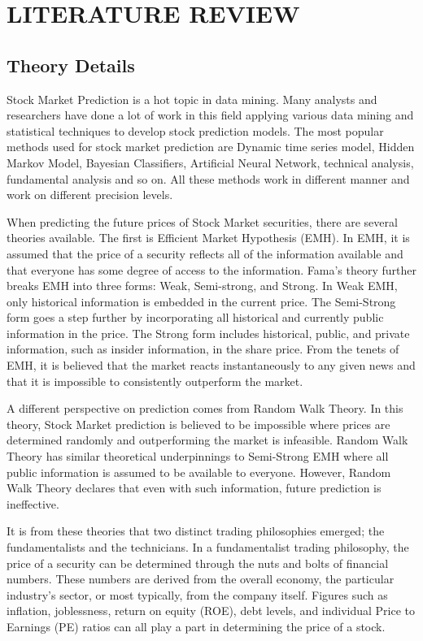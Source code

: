 \section{LITERATURE REVIEW}
\subsection{Theory Details}
Stock Market Prediction is a hot topic in data mining. Many analysts and researchers have done a lot of work in this field applying various data mining and statistical techniques to develop stock prediction models. The most popular methods used for stock market prediction are Dynamic time series model, Hidden Markov Model, Bayesian Classifiers, Artificial Neural Network, technical analysis, fundamental analysis and so on. All these methods work in different manner and work on different precision levels.
 
When predicting the future prices of Stock Market securities, there are several theories available. The first is Efficient Market Hypothesis (EMH). \cite{emh} In EMH, it is assumed that the price of a security reflects all of the information available and that everyone has some degree of access to the information. Fama's theory further breaks EMH into three forms: Weak, Semi-strong, and Strong. In Weak EMH, only historical information is embedded in the current price. The Semi-Strong form goes a step further by incorporating all historical and currently public information in the price. The Strong form includes historical, public, and private information, such as insider information, in the share price. From the tenets of EMH, it is believed that the market reacts instantaneously to any given news and that it is impossible to consistently outperform the market.

A different perspective on prediction comes from Random Walk Theory. \cite{mal} In this theory, Stock Market prediction is believed to be impossible where prices are determined randomly and outperforming the market is infeasible. Random Walk Theory has similar theoretical underpinnings to Semi-Strong EMH where all public information is assumed to be available to everyone. However, Random Walk Theory declares that even with such information, future prediction is ineffective.

It is from these theories that two distinct trading philosophies emerged; the fundamentalists and the technicians. In a fundamentalist trading philosophy, the price of a security can be determined through the nuts and bolts of financial numbers. These numbers are derived from the overall economy, the particular industry's sector, or most typically, from the company itself. Figures such as inflation, joblessness, return on equity (ROE), debt levels, and individual Price to Earnings (PE) ratios can all play a part in determining the price of a stock.

